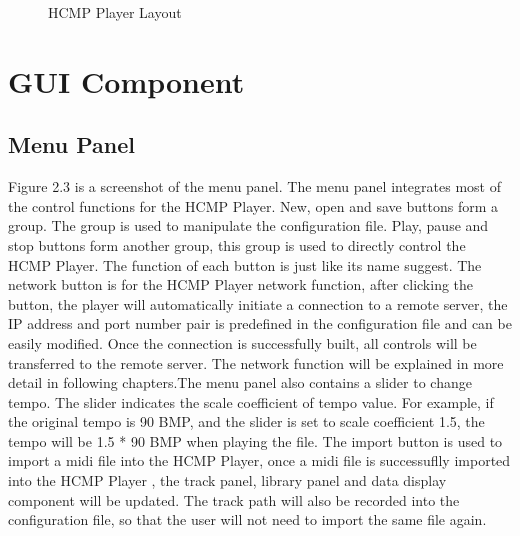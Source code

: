 \begin{figure}[H]
\caption{HCMP Player Layout}
\label{fig:speciation}
\end{figure}

\section{GUI Component}

\subsection{Menu Panel}

Figure 2.3 is a screenshot of the menu panel. The menu panel integrates most of the control 
functions for the HCMP Player. New, open and save buttons form a group. The group is used to 
manipulate the configuration file. Play, pause and stop buttons form another group, 
this group is used to directly control the HCMP Player. 
The function of each button is just like its name suggest. The network button 
is for the HCMP Player  
network function, after clicking the button, the player will automatically 
initiate a connection to a remote server, the IP address and port number pair is 
predefined in the configuration file and can be easily modified. Once the connection is 
successfully built, all controls will be transferred to the remote server. 
The network function will be explained in more detail in following
chapters.The menu panel also contains a slider to change 
tempo. The slider indicates the scale coefficient of tempo value. For example, 
if the original tempo is 90 BMP, and the slider is set to scale coefficient 1.5, 
the tempo will be 1.5 * 90 
BMP when playing the file. The import button is used to import a midi file 
into the HCMP Player, once a midi file is successuflly imported into the HCMP Player  
, the track panel, library panel and data display component will be updated. 
The track path will also be recorded into the configuration file, so that the user 
will not need to import the same file again.

